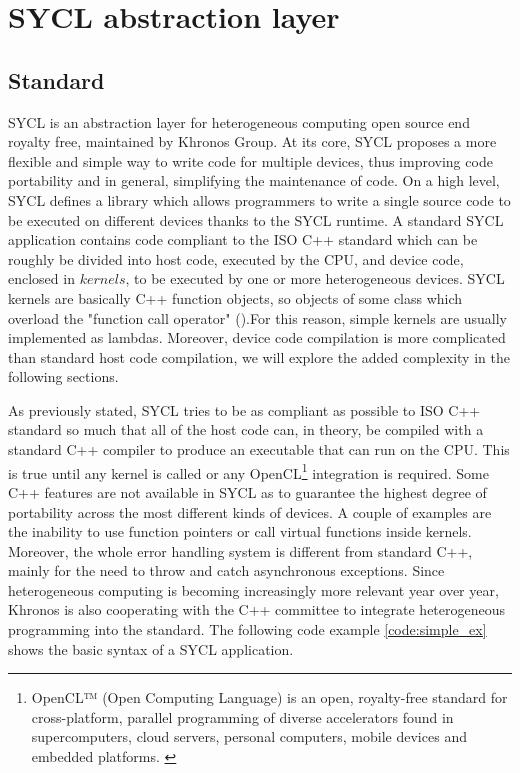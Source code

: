 \chapter{SYCL abstraction layer}
\label{ch:2}
\section{Standard}
\label{ch:sycl_standard}
SYCL is an abstraction layer for heterogeneous computing open source end royalty free, maintained by Khronos Group. At its core, SYCL proposes a more flexible and simple way to write code for multiple devices, thus improving code portability and in general, simplifying the maintenance of code. On a high level, SYCL defines a library which allows programmers to write a single source code to be executed on different devices thanks to the SYCL runtime. A standard SYCL application contains code compliant to the ISO C++ standard which can be roughly be divided into host code, executed by the CPU, and device code, enclosed in $kernels$, to be executed by one or more heterogeneous devices. SYCL kernels are basically C++ function objects, so objects of some class which overload the "function call operator" ().For this reason, simple kernels are usually implemented as lambdas. Moreover, device code compilation is more complicated than standard host code compilation, we will explore the added complexity in the following sections. 

As previously stated, SYCL tries to be as compliant as possible to ISO C++ standard so much that all of the host code can, in theory, be compiled with a standard C++ compiler to produce an executable that can run on the CPU. This is true until any kernel is called or any OpenCL\footnote{OpenCL™ (Open Computing Language) is an open, royalty-free standard for cross-platform, parallel programming of diverse accelerators found in supercomputers, cloud servers, personal computers, mobile devices and embedded platforms. \cite{OpenCL}} integration is required. Some C++ features are not available in SYCL as to guarantee the highest degree of portability across the most different kinds of devices. A couple of examples are the inability to use function pointers or call virtual functions inside kernels. Moreover, the whole error handling system is different from standard C++, mainly for the need to throw and catch asynchronous exceptions. Since heterogeneous computing is becoming increasingly more relevant year over year, Khronos is also cooperating with the C++ committee to integrate heterogeneous programming into the standard. The following code example \ref{code:simple_ex} shows the basic syntax of a SYCL application.

